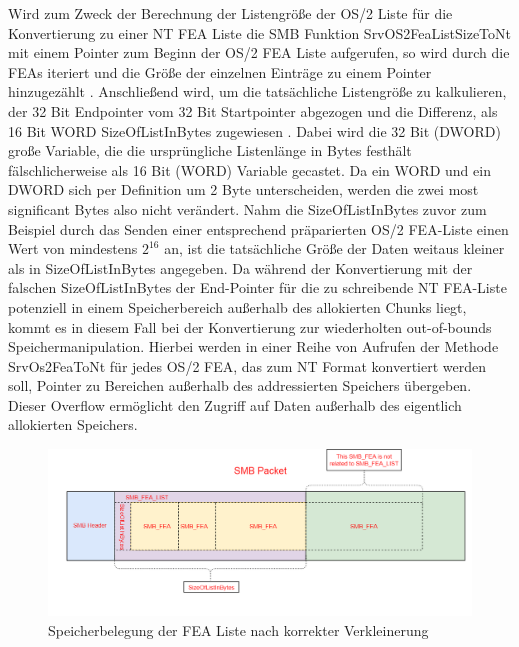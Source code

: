 \documentclass[DIV=12,headings=normal,pdftex,headinclude=false,footinclude=false,final]{scrreprt}
\begin{document}
\noindent
Wird zum Zweck der Berechnung der Listengröße der OS/2 Liste für die Konvertierung zu einer NT FEA Liste die SMB Funktion SrvOS2FeaListSizeToNt mit einem Pointer zum Beginn der OS/2 FEA Liste aufgerufen, so wird durch die FEAs iteriert und die Größe der einzelnen Einträge zu einem Pointer hinzugezählt \cite{TM:EB}.
Anschließend wird, um die tatsächliche Listengröße zu kalkulieren, der 32 Bit Endpointer vom 32 Bit Startpointer abgezogen und die Differenz, als 16 Bit WORD SizeOfListInBytes zugewiesen \cite{Scad:EB}.
Dabei wird die 32 Bit (DWORD) große Variable, die die ursprüngliche Listenlänge in Bytes festhält fälschlicherweise als 16 Bit (WORD) Variable gecastet. Da ein WORD und ein DWORD sich per Definition um 2 Byte unterscheiden, werden die zwei most significant Bytes also nicht verändert. Nahm die SizeOfListInBytes zuvor zum Beispiel durch das Senden einer entsprechend präparierten OS/2 FEA-Liste einen Wert von mindestens $2^{16}$ an, ist die tatsächliche Größe der Daten weitaus kleiner als in SizeOfListInBytes angegeben\cite{Medium:ExpBible}. Da während der Konvertierung mit der falschen SizeOfListInBytes der End-Pointer für die zu schreibende NT FEA-Liste potenziell in einem Speicherbereich außerhalb des allokierten Chunks liegt, kommt es in diesem Fall bei der Konvertierung zur wiederholten out-of-bounds Speichermanipulation. Hierbei werden in einer Reihe von Aufrufen der Methode SrvOs2FeaToNt für jedes OS/2 FEA, das zum NT Format konvertiert werden soll, Pointer zu Bereichen außerhalb des addressierten Speichers übergeben\cite{Scad:EB}. Dieser Overflow ermöglicht den Zugriff auf Daten außerhalb des eigentlich allokierten Speichers.

\begin{figure}[H]
    \centering
    \includegraphics[width=15cm]{checkpoint_after_shrink_correct.png}
    \caption[FEAList nach korrekter Verkleinerung, Nadav Grossmann (Checkpoint Research), URL: \url{https://research.checkpoint.com/wp-content/uploads/2017/09/eternalblue5.png}]{Speicherbelegung der FEA Liste nach korrekter Verkleinerung}
    \label{img:fealist_after_shrinking_correctly}
\end{figure}
\end{document}
